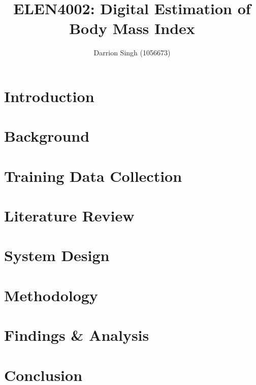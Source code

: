 \documentclass[conference]{IEEEtran}
\title{ELEN4002: Digital Estimation of Body Mass Index}
\author{Darrion Singh (1056673)}
\begin{document}
\maketitle

\begin{abstract}
	
\end{abstract}

\section{Introduction}
\cite{bmiage}
\section{Background}

\section{Training Data Collection}

\section{Literature Review}

\section{System Design}

\section{Methodology}

\section{Findings \& Analysis}

\section{Conclusion}



\end{document}
